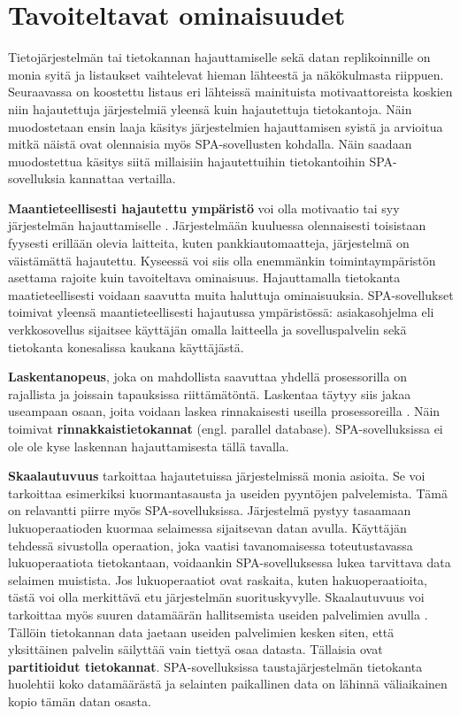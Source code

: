 \documentclass[finnish,twoside,censored,csm,sw-track-2018]{HYthesisML}
\begin{document}
\section{Tavoiteltavat ominaisuudet}

Tietojärjestelmän tai tietokannan hajauttamiselle sekä datan replikoinnille on monia syitä ja listaukset vaihtelevat hieman lähteestä ja näkökulmasta riippuen. Seuraavassa on koostettu listaus eri lähteissä mainituista motivaattoreista koskien niin hajautettuja järjestelmiä yleensä kuin hajautettuja tietokantoja. Näin muodostetaan ensin laaja käsitys järjestelmien hajauttamisen syistä ja arvioitua mitkä näistä ovat olennaisia myös SPA-sovellusten kohdalla. Näin saadaan muodostettua käsitys siitä millaisiin hajautettuihin tietokantoihin SPA-sovelluksia kannattaa vertailla.

\textbf{Maantieteellisesti hajautettu ympäristö} voi olla motivaatio tai syy järjestelmän hajauttamiselle \citep{DSAA}. Järjestelmään kuuluessa olennaisesti toisistaan fyysesti erillään olevia laitteita, kuten pankkiautomaatteja, järjestelmä on väistämättä hajautettu. Kyseessä voi siis olla enemmänkin toimintaympäristön asettama rajoite kuin tavoiteltava ominaisuus. Hajauttamalla tietokanta maatieteellisesti voidaan saavutta muita haluttuja ominaisuuksia. SPA-sovellukset toimivat yleensä maantieteellisesti hajautussa ympäristössä: asiakasohjelma eli verkkosovellus sijaitsee käyttäjän omalla laitteella ja sovelluspalvelin sekä tietokanta konesalissa kaukana käyttäjästä.

\textbf{Laskentanopeus}, joka on mahdollista saavuttaa yhdellä prosessorilla on rajallista ja joissain tapauksissa riittämätöntä. Laskentaa täytyy siis jakaa useampaan osaan, joita voidaan laskea rinnakaisesti useilla prosessoreilla \citep{DSAA}. Näin toimivat \textbf{rinnakkaistietokannat} (engl. parallel database). SPA-sovelluksissa ei ole ole kyse laskennan hajauttamisesta tällä tavalla.

\textbf{Skaalautuvuus} \citep{Tanenbaum} tarkoittaa hajautetuissa järjestelmissä monia asioita. Se voi tarkoittaa esimerkiksi kuormantasausta ja useiden pyyntöjen palvelemista. Tämä on relavantti piirre myös SPA-sovelluksissa. Järjestelmä pystyy tasaamaan lukuoperaatioden kuormaa selaimessa sijaitsevan datan avulla. Käyttäjän tehdessä sivustolla operaation, joka vaatisi tavanomaisessa toteutustavassa lukuoperaatiota tietokantaan, voidaankin SPA-sovelluksessa lukea tarvittava data selaimen muistista. Jos lukuoperaatiot ovat raskaita, kuten hakuoperaatioita, tästä voi olla merkittävä etu järjestelmän suorituskyvylle. Skaalautuvuus voi tarkoittaa myös suuren datamäärän hallitsemista useiden palvelimien avulla \citep{Kleppmann}. Tällöin tietokannan data jaetaan useiden palvelimien kesken siten, että yksittäinen palvelin säilyttää vain tiettyä osaa datasta. Tällaisia ovat \textbf{partitioidut tietokannat}. SPA-sovelluksissa taustajärjestelmän tietokanta huolehtii koko datamäärästä ja selainten paikallinen data on lähinnä väliaikainen kopio tämän datan osasta.
 
\end{document}
